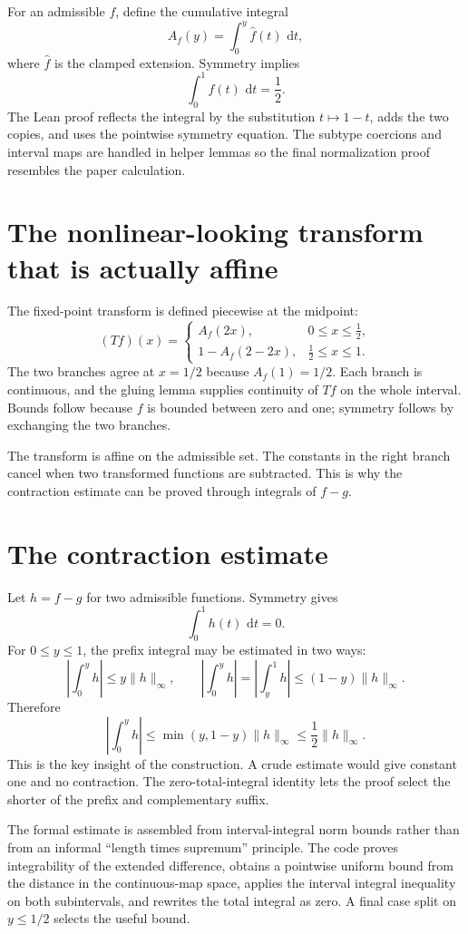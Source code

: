 \documentclass[11pt,oneside]{report}
\theoremstyle{definition}
\theoremstyle{remark}
\newcommand{\dd}{\,\mathrm{d}}
\begin{document}
For an admissible \(f\), define the cumulative integral
\[
  A_f(y)=\int_0^y \widehat f(t)\,\dd t,
\]
where \(\widehat f\) is the clamped extension.  Symmetry implies
\[
  \int_0^1 f(t)\,\dd t=\frac12.
\]
The Lean proof reflects the integral by the substitution \(t\mapsto1-t\), adds the two copies, and uses the pointwise symmetry equation.  The subtype coercions and interval maps are handled in helper lemmas so the final normalization proof resembles the paper calculation.

\section{The nonlinear-looking transform that is actually affine}
The fixed-point transform is defined piecewise at the midpoint:
\[
  (Tf)(x)=
  \begin{cases}
    A_f(2x),&0\leq x\leq\tfrac12,\\[2mm]
    1-A_f(2-2x),&\tfrac12\leq x\leq1.
  \end{cases}
\]
The two branches agree at \(x=1/2\) because \(A_f(1)=1/2\).  Each branch is continuous, and the gluing lemma supplies continuity of \(Tf\) on the whole interval.  Bounds follow because \(f\) is bounded between zero and one; symmetry follows by exchanging the two branches.

The transform is affine on the admissible set.  The constants in the right branch cancel when two transformed functions are subtracted.  This is why the contraction estimate can be proved through integrals of \(f-g\).

\section{The contraction estimate}
Let \(h=f-g\) for two admissible functions.  Symmetry gives
\[
  \int_0^1 h(t)\,\dd t=0.
\]
For \(0\leq y\leq1\), the prefix integral may be estimated in two ways:
\[
  \left|\int_0^y h\right|\leq y\lVert h\rVert_\infty,
  \qquad
  \left|\int_0^y h\right|
   =\left|\int_y^1 h\right|
   \leq(1-y)\lVert h\rVert_\infty.
\]
Therefore
\[
  \left|\int_0^y h\right|
  \leq \min(y,1-y)\lVert h\rVert_\infty
  \leq\frac12\lVert h\rVert_\infty.
\]
This is the key insight of the construction.  A crude estimate would give constant one and no contraction.  The zero-total-integral identity lets the proof select the shorter of the prefix and complementary suffix.

\begin{leanpattern}
The formal estimate is assembled from interval-integral norm bounds rather than from an informal ``length times supremum'' principle.  The code proves integrability of the extended difference, obtains a pointwise uniform bound from the distance in the continuous-map space, applies the interval integral inequality on both subintervals, and rewrites the total integral as zero.  A final case split on \(y\leq1/2\) selects the useful bound.
\end{leanpattern}
\end{document}
